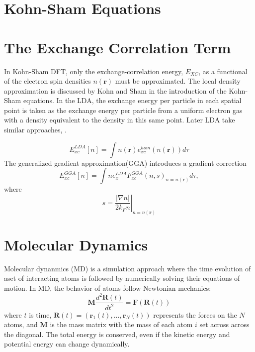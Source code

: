 \section{Kohn-Sham Equations}

\section{The Exchange Correlation Term}

In Kohn-Sham DFT, only the exchange-correlation energy, $E_{XC}$, as a functional of the electron spin densities $n(\bm{r})$ must be approximated.
The local density approximation is discussed by Kohn and Sham\cite{kohn1965_dft} in the introduction of the Kohn-Sham equations.
In the LDA, the exchange energy per particle in each spatial point is taken as the exchange energy per particle from a uniform electron gas with a density equivalent to the density in this same point\cite{ceperley1980_lda}.
Later LDA take similar approaches, \cite{vosko1980_lda_vwm, perdew1981_lda_pz, perdew1992_lda_pw}.

\begin{equation}
	E_{xc}^{LDA}[n]=\int n(\bm{r})e_{xc}^{hom}(n(\bm{r}))d\tau
\end{equation}
The generalized gradient approximation(GGA)\cite{langreth1983_gga_1,becke1988_gga_2} introduces a gradient correction
\begin{equation}
	E_{xc}^{GGA}[n]=\int n e_x^{LDA} F_{xc}^{GGA}(n,s)_{n=n(\bm{r})}d\tau,
\end{equation}
where
\begin{equation}
	s =\left.
	       \frac{\lvert\nabla n\rvert}{2k_F n}
	   \right\rvert_{n=n(\bm{r})}
\end{equation}

\section{Molecular Dynamics}
Molecular dynanmics (MD) is a simulation approach where the time evolution of aset of interacting atoms is followed by numerically solving their equations of motion.  In MD, the behavior of atoms follow Newtonian mechanics:
\begin{equation}
	  \label{eq:newton_eom}
    \bm{M}\frac{d^2\bm{R}(t)}{dt^2} = \bm{F}(\bm{R}(t))
\end{equation}
where $t$ is time, $\bm{R}(t) = (\bm{r}_1(t),...,\bm{r}_N(t))$ represents the forces on the $N$ atoms, and $\bm{M}$ is the mass matrix with the mass of each atom $i$ set across across the diagonal.
The total energy is conserved, even if the kinetic energy and potential energy can change dynamically.

